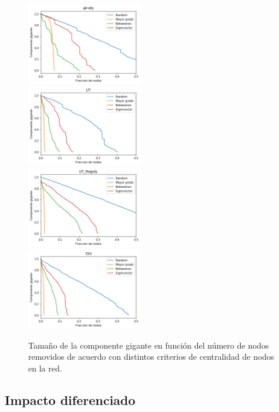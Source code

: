 \documentclass[%
 reprint,
 amsmath,amssymb,
 aps,
]{revtex4-1}
\begin{document}
\begin{figure}
\includegraphics[width=0.45\textwidth]{figura2a.png}\\
\includegraphics[width=0.45\textwidth]{figura2b.png}\\
\includegraphics[width=0.45\textwidth]{figura2c.png}\\
\includegraphics[width=0.45\textwidth]{figura2d.png}\\
\label{figura2}
\caption{Tama\~no de la componente gigante en funci\'on del n\'umero de nodos removidos de acuerdo con distintos criterios de centralidad de nodos en la red.}
\end{figure}

\subsection{Impacto diferenciado}
\end{document}
